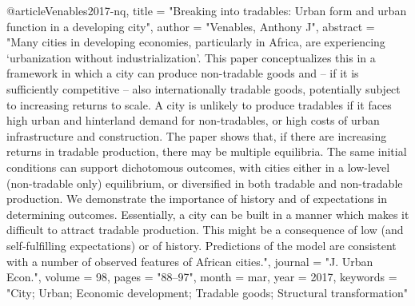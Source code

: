 {@article{Venables2017-nq,
	title    = "Breaking into tradables: Urban form and urban function in a
	developing city",
	author   = "Venables, Anthony J",
	abstract = "Many cities in developing economies, particularly in Africa, are
	experiencing `urbanization without industrialization'. This paper
	conceptualizes this in a framework in which a city can produce
	non-tradable goods and -- if it is sufficiently competitive --
	also internationally tradable goods, potentially subject to
	increasing returns to scale. A city is unlikely to produce
	tradables if it faces high urban and hinterland demand for
	non-tradables, or high costs of urban infrastructure and
	construction. The paper shows that, if there are increasing
	returns in tradable production, there may be multiple equilibria.
	The same initial conditions can support dichotomous outcomes,
	with cities either in a low-level (non-tradable only)
	equilibrium, or diversified in both tradable and non-tradable
	production. We demonstrate the importance of history and of
	expectations in determining outcomes. Essentially, a city can be
	built in a manner which makes it difficult to attract tradable
	production. This might be a consequence of low (and
	self-fulfilling expectations) or of history. Predictions of the
	model are consistent with a number of observed features of
	African cities.",
	journal  = "J. Urban Econ.",
	volume   =  98,
	pages    = "88--97",
	month    =  mar,
	year     =  2017,
	keywords = "City; Urban; Economic development; Tradable goods; Structural
	transformation"
}

}
